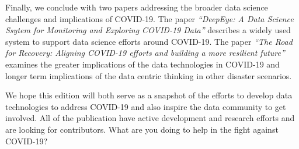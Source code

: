 \documentclass[11pt]{article}
\begin{document}
Finally, we conclude with two papers addressing the broader data science challenges and implications of COVID-19.
The paper \emph{``DeepEye: A Data Science Ssytem for Monitoring and Exploring COVID-19 Data''} describes a widely used system to support data science efforts around COVID-19.
The paper \emph{``The Road for Recovery: Aligning COVID-19 efforts and building a more resilient future''} examines the greater implications of the data technologies in COVID-19 and
longer term implications of the data centric thinking in other disaster scenarios.


We hope this edition will both serve as a snapshot of the efforts to develop data technologies to address COVID-19 and also inspire the data community to get involved. 
All of the publication have active development and research efforts and are looking for contributors.
What are you doing to help in the fight against COVID-19?
\end{document}
